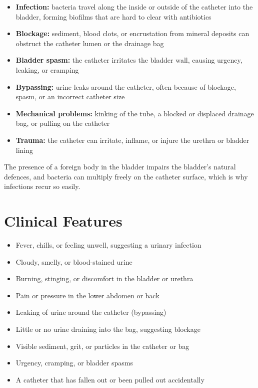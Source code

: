 \begin{itemize}
    \item \textbf{Infection:} bacteria travel along the inside or outside of the catheter into the bladder, forming biofilms that are hard to clear with antibiotics
    \item \textbf{Blockage:} sediment, blood clots, or encrustation from mineral deposits can obstruct the catheter lumen or the drainage bag
    \item \textbf{Bladder spasm:} the catheter irritates the bladder wall, causing urgency, leaking, or cramping
    \item \textbf{Bypassing:} urine leaks around the catheter, often because of blockage, spasm, or an incorrect catheter size
    \item \textbf{Mechanical problems:} kinking of the tube, a blocked or displaced drainage bag, or pulling on the catheter
    \item \textbf{Trauma:} the catheter can irritate, inflame, or injure the urethra or bladder lining
\end{itemize}

The presence of a foreign body in the bladder impairs the bladder's natural defences, and bacteria can multiply freely on the catheter surface, which is why infections recur so easily.

\section*{Clinical Features}
\begin{itemize}
    \item Fever, chills, or feeling unwell, suggesting a urinary infection
    \item Cloudy, smelly, or blood-stained urine
    \item Burning, stinging, or discomfort in the bladder or urethra
    \item Pain or pressure in the lower abdomen or back
    \item Leaking of urine around the catheter (bypassing)
    \item Little or no urine draining into the bag, suggesting blockage
    \item Visible sediment, grit, or particles in the catheter or bag
    \item Urgency, cramping, or bladder spasms
    \item A catheter that has fallen out or been pulled out accidentally
\end{itemize}

